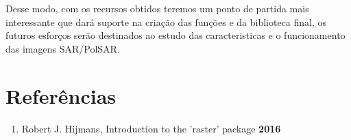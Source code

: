 \documentclass[12pt,letterpaper]{article}
\begin{document}
Desse modo, com os recursos obtidos teremos um ponto de partida mais interessante que dará suporte na criação das funções e da biblioteca final, os futuros esforços serão destinados ao estudo das caracteristicas e o funcionamento das imagens SAR/PolSAR. 

\section*{Referências}

\begin{enumerate}
\item Robert J. Hijmans, Introduction to the ’raster’ package \textbf{2016}
\end{enumerate}
\end{document}
